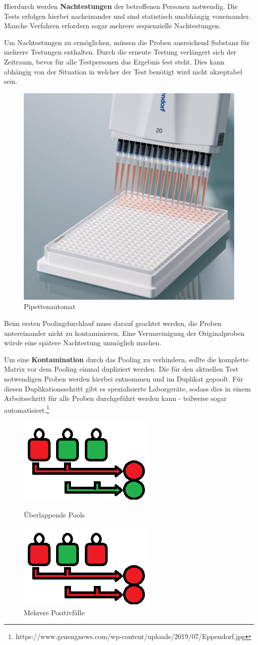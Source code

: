 Hierdurch werden \textbf{Nachtestungen} der betroffenen Personen notwendig.
Die Tests erfolgen hierbei nacheinander und sind statistisch unabhängig voneinander.
Manche Verfahren erfordern sogar mehrere sequenzielle Nachtestungen.

Um Nachtestungen zu ermöglichen, müssen die Proben ausreichend Substanz für mehrere Testungen enthalten.
Durch die erneute Testung verlängert sich der Zeitraum, bevor für alle Testpersonen das Ergebnis fest steht.
Dies kann abhängig von der Situation in welcher der Test benötigt wird nicht akzeptabel sein.

\cleardoublepage
\begin{figure}
	\includegraphics[width=.4\textwidth]{img/Pipettenmatrix}
	\caption{Pipettenautomat}
\end{figure}
Beim ersten Poolingdurchlauf muss darauf geachtet werden, die Proben untereinander nicht zu kontaminieren.
Eine Verunreinigung der Originalproben würde eine spätere Nachtestung unmöglich machen.

Um eine \textbf{Kontamination} durch das Pooling zu verhindern, sollte die komplette Matrix vor dem Pooling einmal dupliziert werden. 
Die für den aktuellen Test notwendigen Proben werden hierbei entnommen und im Duplikat gepoolt.
Für diesen Duplikationsschritt gibt es spezialisierte Laborgeräte, sodass dies in einem Arbeitsschritt für alle Proben durchgeführt werden kann - teilweise sogar automatisiert.\footnote{https://www.genengnews.com/wp-content/uploads/2019/07/Eppendorf.jpg}

\begin{figure}
	\includegraphics[width=.4\textwidth]{img/KomplexePools}
	\caption{Überlappende Pools}
	
	\includegraphics[width=.4\textwidth]{img/MehrerePositiv}
	\caption{Mehrere Positivfälle}
\end{figure}

